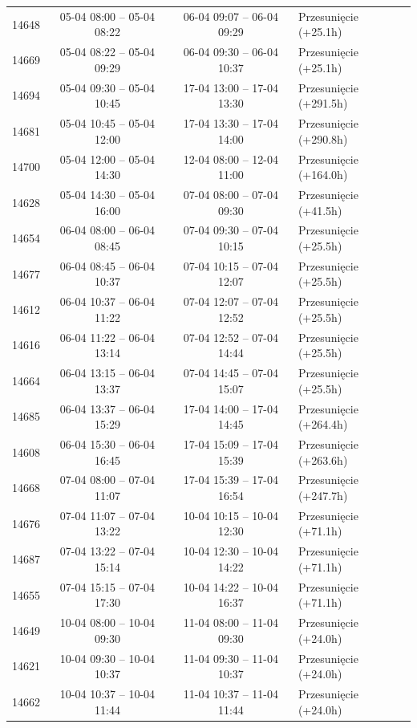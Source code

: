 \begin{table}[htbp]
\begin{tabular}{|r|c|c|l|}
14648 & 05-04 08:00 -- 05-04 08:22 & 06-04 09:07 -- 06-04 09:29 & Przesunięcie (+25.1h) \\ 
14669 & 05-04 08:22 -- 05-04 09:29 & 06-04 09:30 -- 06-04 10:37 & Przesunięcie (+25.1h) \\ 
14694 & 05-04 09:30 -- 05-04 10:45 & 17-04 13:00 -- 17-04 13:30 & Przesunięcie (+291.5h) \\ 
14681 & 05-04 10:45 -- 05-04 12:00 & 17-04 13:30 -- 17-04 14:00 & Przesunięcie (+290.8h) \\ 
14700 & 05-04 12:00 -- 05-04 14:30 & 12-04 08:00 -- 12-04 11:00 & Przesunięcie (+164.0h) \\ 
14628 & 05-04 14:30 -- 05-04 16:00 & 07-04 08:00 -- 07-04 09:30 & Przesunięcie (+41.5h) \\ 
14654 & 06-04 08:00 -- 06-04 08:45 & 07-04 09:30 -- 07-04 10:15 & Przesunięcie (+25.5h) \\ 
14677 & 06-04 08:45 -- 06-04 10:37 & 07-04 10:15 -- 07-04 12:07 & Przesunięcie (+25.5h) \\ 
14612 & 06-04 10:37 -- 06-04 11:22 & 07-04 12:07 -- 07-04 12:52 & Przesunięcie (+25.5h) \\ 
14616 & 06-04 11:22 -- 06-04 13:14 & 07-04 12:52 -- 07-04 14:44 & Przesunięcie (+25.5h) \\ 
14664 & 06-04 13:15 -- 06-04 13:37 & 07-04 14:45 -- 07-04 15:07 & Przesunięcie (+25.5h) \\ 
14685 & 06-04 13:37 -- 06-04 15:29 & 17-04 14:00 -- 17-04 14:45 & Przesunięcie (+264.4h) \\ 
14608 & 06-04 15:30 -- 06-04 16:45 & 17-04 15:09 -- 17-04 15:39 & Przesunięcie (+263.6h) \\ 
14668 & 07-04 08:00 -- 07-04 11:07 & 17-04 15:39 -- 17-04 16:54 & Przesunięcie (+247.7h) \\ 
14676 & 07-04 11:07 -- 07-04 13:22 & 10-04 10:15 -- 10-04 12:30 & Przesunięcie (+71.1h) \\ 
14687 & 07-04 13:22 -- 07-04 15:14 & 10-04 12:30 -- 10-04 14:22 & Przesunięcie (+71.1h) \\ 
14655 & 07-04 15:15 -- 07-04 17:30 & 10-04 14:22 -- 10-04 16:37 & Przesunięcie (+71.1h) \\ 
14649 & 10-04 08:00 -- 10-04 09:30 & 11-04 08:00 -- 11-04 09:30 & Przesunięcie (+24.0h) \\ 
14621 & 10-04 09:30 -- 10-04 10:37 & 11-04 09:30 -- 11-04 10:37 & Przesunięcie (+24.0h) \\ 
14662 & 10-04 10:37 -- 10-04 11:44 & 11-04 10:37 -- 11-04 11:44 & Przesunięcie (+24.0h) \\ 

\end{tabular}
\end{table}
